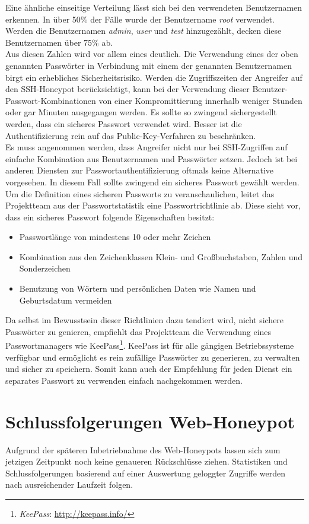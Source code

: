Eine ähnliche einseitige Verteilung lässt sich bei den verwendeten Benutzernamen erkennen. In über 50\% der Fälle wurde der Benutzername \textit{root} verwendet. Werden die Benutzernamen \textit{admin}, \textit{user} und \textit{test} hinzugezählt, decken diese Benutzernamen über 75\% ab.\\

Aus diesen Zahlen wird vor allem eines deutlich. Die Verwendung eines der oben genannten Passwörter in Verbindung mit einem der genannten Benutzernamen birgt ein erhebliches Sicherheitsrisiko. Werden die Zugriffszeiten der Angreifer auf den SSH-Honeypot berücksichtigt, kann bei der Verwendung dieser Benutzer-Passwort-Kombinationen von einer Kompromittierung innerhalb weniger Stunden oder gar Minuten ausgegangen werden. Es sollte so zwingend sichergestellt werden, dass ein sicheres Passwort verwendet wird. Besser ist die Authentifizierung rein auf das Public-Key-Verfahren zu beschränken.\\

Es muss angenommen werden, dass Angreifer nicht nur bei SSH-Zugriffen auf einfache Kombination aus Benutzernamen und Passwörter setzen. Jedoch ist bei anderen Diensten zur Passwortauthentifizierung oftmals keine Alternative vorgesehen. In diesem Fall sollte zwingend ein sicheres Passwort gewählt werden. Um die Definition eines sicheren Passworts zu veranschaulichen, leitet das Projektteam aus der Passwortstatistik eine Passwortrichtlinie ab. Diese sieht vor, dass ein sicheres Passwort folgende Eigenschaften besitzt:

\begin{itemize}
\item Passwortlänge von mindestens 10 oder mehr Zeichen
\item Kombination aus den Zeichenklassen Klein- und Großbuchstaben, Zahlen und Sonderzeichen
\item Benutzung von Wörtern und persönlichen Daten wie Namen und Geburtsdatum vermeiden
\end{itemize}

Da selbst im Bewusstsein dieser Richtlinien dazu tendiert wird, nicht sichere Passwörter zu genieren, empfiehlt das Projektteam die Verwendung eines Passwortmanagers wie KeePass\footnote{ \textit{KeePass}: \url{http://keepass.info/}}. KeePass ist für alle gängigen Betriebssysteme verfügbar und ermöglicht es rein zufällige Passwörter zu generieren, zu verwalten und sicher zu speichern. Somit kann auch der Empfehlung für jeden Dienst ein separates Passwort zu verwenden einfach nachgekommen werden.

\section{Schlussfolgerungen Web-Honeypot}
\label{sec:Schlussfolgerungen Web-Honeypot}


Aufgrund der späteren Inbetriebnahme des Web-Honeypots lassen sich zum jetzigen Zeitpunkt noch keine genaueren Rückschlüsse ziehen. Statistiken und Schlussfolgerungen basierend auf einer Auswertung geloggter Zugriffe werden nach ausreichender Laufzeit folgen.
